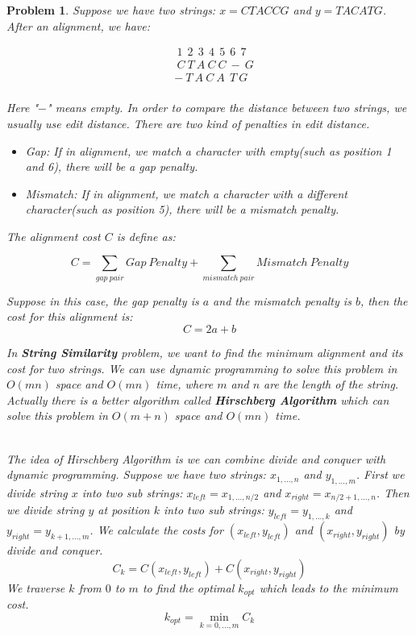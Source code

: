 \documentclass[12pt]{article}
\newtheorem{hw}{Problem}
\begin{document}
\begin{hw}\rm
	
	Suppose we have two strings: $x=CTACCG$ and $y=TACATG$. After an alignment, we have:

	\begin{align*}
		&\ 1\ \ 2\ \ 3\ \ 4\ \ 5\ \ 6\ \ 7\\
		&\ C\ T\ A\ C\ C\ -\ G\\
		&-\ T\ A\ C\ A\ \ T\ G\\
	\end{align*}

	Here "$-$" means empty. In order to compare the distance between two strings, we usually use edit distance. There are two kind of penalties in edit distance.
	\begin{itemize}
		\item Gap: If in alignment, we match a character with empty(such as position 1 and 6), there will be a gap penalty.
		
		\item Mismatch: If in alignment, we match a character with a different character(such as position 5), there will be a mismatch penalty.
	\end{itemize} 

	The alignment cost $C$ is define as:
	
	\begin{equation*}
		C = \sum_{gap\ pair}Gap\ Penalty + \sum_{mismatch\ pair}Mismatch\ Penalty
	\end{equation*}

	Suppose in this case, the gap penalty is $a$ and the mismatch penalty is $b$, then the cost for this alignment is:
	\begin{equation*}
		C = 2a+b
	\end{equation*}

	In \textbf{String Similarity} problem, we want to find the minimum alignment and its cost for two strings. We can use dynamic programming to solve this problem in $O(mn)$ space and $O(mn)$ time, where $m$ and $n$ are the length of the string. Actually there is a better algorithm called \textbf{Hirschberg Algorithm} which can solve this problem in $O(m+n)$ space and $O(mn)$ time.
	
	~\\
	The idea of Hirschberg Algorithm is we can combine divide and conquer with dynamic programming. Suppose we have two strings: $x_{1,...,n}$ and $y_{1,...,m}$. First we divide string $x$ into two sub strings: $x_{left} = x_{1,...,n/2}$ and $x_{right} = x_{n/2+1,...,n}$. Then we divide string $y$ at position $k$ into two sub strings: $y_{left} = y_{1,...,k}$ and $y_{right} = y_{k+1,...,m}$. We calculate the costs for $(x_{left}, y_{left})$ and $(x_{right}, y_{right})$ by divide and conquer. 
	\begin{equation*}
		C_k=C(x_{left}, y_{left}) + C(x_{right}, y_{right})
	\end{equation*}
	We traverse $k$ from $0$ to $m$ to find the optimal $k_{opt}$ which leads to the minimum cost.
	\begin{equation*}
		k_{opt} = \min_{k=0,...,m}C_k
	\end{equation*}
	

\end{hw}
\end{document}
